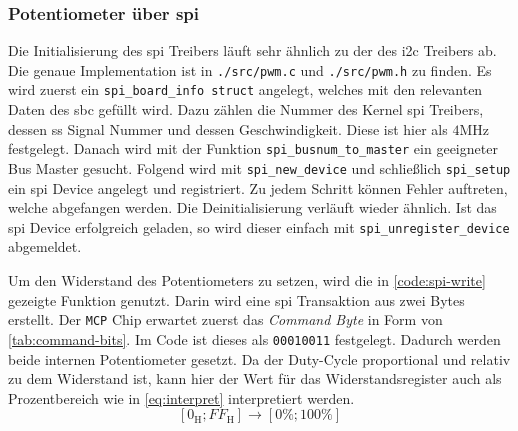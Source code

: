 \subsubsection{Potentiometer über \acrshort{spi}}

Die Initialisierung des \gls{spi} Treibers läuft sehr ähnlich zu der des \gls{i2c} Treibers ab.
Die genaue Implementation ist in \texttt{./src/pwm.c} und \texttt{./src/pwm.h} zu finden.
Es wird zuerst ein \texttt{spi\_board\_info struct} angelegt, welches mit den relevanten Daten des \gls{sbc} gefüllt wird.
Dazu zählen die Nummer des Kernel \gls{spi} Treibers, dessen \gls{ss} Signal Nummer und dessen Geschwindigkeit.
Diese ist hier als $4\si{\mega\hertz}$ festgelegt.
Danach wird mit der Funktion \texttt{spi\_busnum\_to\_master} ein geeigneter Bus Master gesucht.
Folgend wird mit \texttt{spi\_new\_device} und schließlich \texttt{spi\_setup} ein \gls{spi} Device angelegt und registriert.
Zu jedem Schritt können Fehler auftreten, welche abgefangen werden.
Die Deinitialisierung verläuft wieder ähnlich.
Ist das \gls{spi} Device erfolgreich geladen, so wird dieser einfach mit \texttt{spi\_unregister\_device} abgemeldet.

Um den Widerstand des Potentiometers zu setzen, wird die in \autoref{code:spi-write} gezeigte Funktion genutzt.
Darin wird eine \gls{spi} Transaktion aus zwei Bytes erstellt.
Der \texttt{MCP} Chip erwartet zuerst das \textit{Command Byte} in Form von \autoref{tab:command-bits}.
Im Code ist dieses als \texttt{00010011} festgelegt.
Dadurch werden beide internen Potentiometer gesetzt.
Da der Duty-Cycle proportional und relativ zu dem Widerstand ist, kann hier der Wert für das Widerstandsregister auch als Prozentbereich wie in \autoref{eq:interpret} interpretiert werden.
\begin{equation}
    \left[0_{\text{H}}; FF_{\text{H}}\right] \rightarrow \left[0\%; 100\%\right]
    \label{eq:interpret}
\end{equation}




